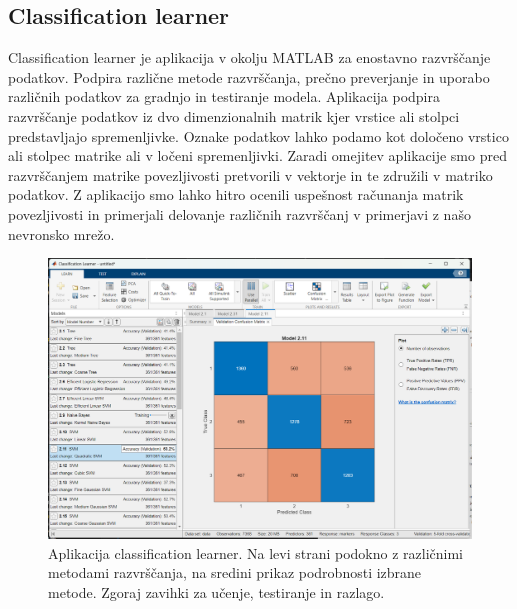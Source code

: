 \subsection{Classification learner}
Classification learner je aplikacija v okolju MATLAB za enostavno razvrščanje podatkov. Podpira različne metode razvrščanja, prečno preverjanje in uporabo različnih podatkov za gradnjo in testiranje modela. Aplikacija podpira razvrščanje podatkov iz dvo dimenzionalnih matrik kjer vrstice ali stolpci predstavljajo spremenljivke. Oznake podatkov lahko podamo kot določeno vrstico ali stolpec matrike ali v ločeni spremenljivki. Zaradi omejitev aplikacije smo pred razvrščanjem matrike povezljivosti pretvorili v vektorje in te združili v matriko podatkov. Z aplikacijo smo lahko hitro ocenili uspešnost računanja matrik povezljivosti in primerjali delovanje različnih razvrščanj v primerjavi z našo nevronsko mrežo.
\begin{figure}[h!]
    \begin{center}
    \includegraphics[width=1\linewidth]{slike/ClasificationLearner.png}
    \end{center}
    \caption{Aplikacija classification learner. Na levi strani podokno z različnimi metodami razvrščanja, na sredini prikaz podrobnosti izbrane metode. Zgoraj zavihki za učenje, testiranje in razlago. }
    \end{figure}


